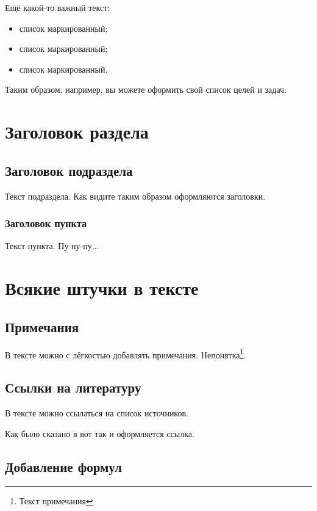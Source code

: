 \documentclass[a4paper, 14pt]{extarticle}
\begin{document}
Ещё какой-то важный текст:

\begin{itemize}
	\item список маркированный;
	\item список маркированный;
	\item список маркированный.
\end{itemize}

Таким образом, например, вы можете оформить свой список целей и задач.


\clearpage
\section{Заголовок раздела}

\subsection{Заголовок подраздела}

Текст подраздела. Как видите таким образом оформляются заголовки.

\subsubsection{Заголовок пункта}

Текст пункта. Пу-пу-пу...


\clearpage
\section{Всякие штучки в тексте}

\subsection{Примечания}

В тексте можно с лёгкостью добавлять примечания. Непонятка\footnote{Текст примечания}.

\subsection{Ссылки на литературу}

В тексте можно ссылаться на список источников.

Как было сказано в \cite{ivanov2020} вот так и оформляется ссылка.

\subsection{Добавление формул}
\end{document}
